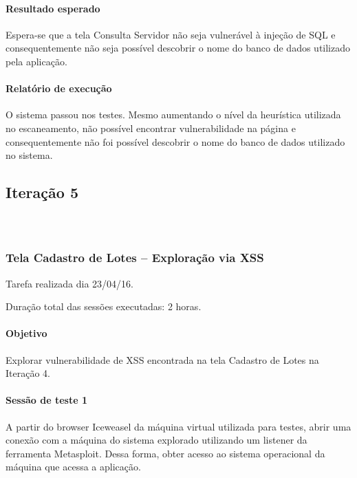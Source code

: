 \documentclass[
    12pt,               %
    openright,          %
    oneside,            %
    a4paper,            %
    section=TITLE,     %
    english,            %
    french,             %
    spanish,            %
    brazil              %
    ]{abntex2}
\begin{document}
\paragraph*{Resultado esperado}

Espera-se que a tela Consulta Servidor não seja vulnerável à injeção de SQL e consequentemente não seja possível descobrir o nome do banco de dados utilizado pela aplicação.



\paragraph*{Relatório de execução}

O sistema passou nos testes. Mesmo aumentando o nível da heurística utilizada no escaneamento, não possível encontrar vulnerabilidade na página e consequentemente não foi possível descobrir o nome do banco de dados utilizado no sistema.



\subsection{Iteração 5}


\subsubsection*{~}


\subsubsection*{Tela Cadastro de Lotes -- Exploração via XSS}

Tarefa realizada dia 23/04/16.


Duração total das sessões executadas: 2 horas.



\paragraph*{Objetivo}

Explorar vulnerabilidade de XSS encontrada na tela Cadastro de Lotes na Iteração 4.



\paragraph*{Sessão de teste 1}

A partir do browser Iceweasel da máquina virtual utilizada para testes, abrir uma conexão com a máquina do sistema explorado utilizando um listener da ferramenta Metasploit. Dessa forma, obter acesso ao sistema operacional da máquina que acessa a aplicação.
\end{document}
